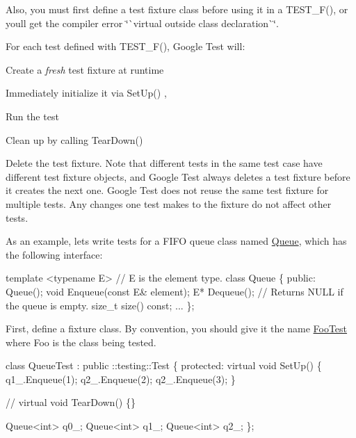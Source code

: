 Also, you must first define a test fixture class before using it in a {\ttfamily T\+E\+S\+T\+\_\+\+F()}, or you\textquotesingle{}ll get the compiler error \char`\"{}\`{}virtual outside class
declaration\`{}\char`\"{}.

For each test defined with {\ttfamily T\+E\+S\+T\+\_\+\+F()}, Google Test will\+:
\begin{DoxyEnumerate}
\item Create a {\itshape fresh} test fixture at runtime
\end{DoxyEnumerate}
\begin{DoxyEnumerate}
\item Immediately initialize it via {\ttfamily Set\+Up()} ,
\end{DoxyEnumerate}
\begin{DoxyEnumerate}
\item Run the test
\end{DoxyEnumerate}
\begin{DoxyEnumerate}
\item Clean up by calling {\ttfamily Tear\+Down()}
\end{DoxyEnumerate}
\begin{DoxyEnumerate}
\item Delete the test fixture. Note that different tests in the same test case have different test fixture objects, and Google Test always deletes a test fixture before it creates the next one. Google Test does not reuse the same test fixture for multiple tests. Any changes one test makes to the fixture do not affect other tests.
\end{DoxyEnumerate}

As an example, let\textquotesingle{}s write tests for a F\+I\+FO queue class named {\ttfamily \mbox{\hyperlink{class_queue}{Queue}}}, which has the following interface\+: 
\begin{DoxyCode}
template <typename E> // E is the element type.
class Queue \{
 public:
  Queue();
  void Enqueue(const E& element);
  E* Dequeue(); // Returns NULL if the queue is empty.
  size\_t size() const;
  ...
\};
\end{DoxyCode}


First, define a fixture class. By convention, you should give it the name {\ttfamily \mbox{\hyperlink{class_foo_test}{Foo\+Test}}} where {\ttfamily Foo} is the class being tested. 
\begin{DoxyCode}
class QueueTest : public ::testing::Test \{
 protected:
  virtual void SetUp() \{
    q1\_.Enqueue(1);
    q2\_.Enqueue(2);
    q2\_.Enqueue(3);
  \}

  // virtual void TearDown() \{\}

  Queue<int> q0\_;
  Queue<int> q1\_;
  Queue<int> q2\_;
\};
\end{DoxyCode}


